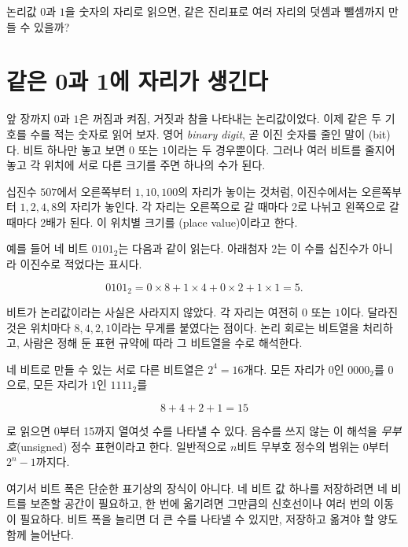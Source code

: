 \begin{objectivebox}
논리값 \(0\)과 \(1\)을 숫자의 자리로 읽으면, 같은 진리표로 여러 자리의 덧셈과 뺄셈까지 만들 수 있을까?
\end{objectivebox}

\section{같은 0과 1에 자리가 생긴다}

앞 장까지 \(0\)과 \(1\)은 꺼짐과 켜짐, 거짓과 참을 나타내는 논리값이었다. 이제 같은 두 기호를 수를 적는 숫자로 읽어 보자. 영어 \emph{binary digit}, 곧 이진 숫자를 줄인 말이 (bit)다. 비트 하나만 놓고 보면 \(0\) 또는 \(1\)이라는 두 경우뿐이다. 그러나 여러 비트를 줄지어 놓고 각 위치에 서로 다른 크기를 주면 하나의 수가 된다.

십진수 \(507\)에서 오른쪽부터 \(1,10,100\)의 자리가 놓이는 것처럼, 이진수에서는 오른쪽부터 \(1,2,4,8\)의 자리가 놓인다. 각 자리는 오른쪽으로 갈 때마다 2로 나뉘고 왼쪽으로 갈 때마다 2배가 된다. 이 위치별 크기를 (place value)이라고 한다.

예를 들어 네 비트 \(0101_2\)는 다음과 같이 읽는다. 아래첨자 \(2\)는 이 수를 십진수가 아니라 이진수로 적었다는 표시다.

\[
  0101_2
  =0\times8+1\times4+0\times2+1\times1
  =5.
\]

비트가 논리값이라는 사실은 사라지지 않았다. 각 자리는 여전히 \(0\) 또는 \(1\)이다. 달라진 것은 위치마다 \(8,4,2,1\)이라는 무게를 붙였다는 점이다. 논리 회로는 비트열을 처리하고, 사람은 정해 둔 표현 규약에 따라 그 비트열을 수로 해석한다\parencite{mit6004information}.

네 비트로 만들 수 있는 서로 다른 비트열은 \(2^4=16\)개다. 모든 자리가 \(0\)인 \(0000_2\)를 0으로, 모든 자리가 \(1\)인 \(1111_2\)를

\[
  8+4+2+1=15
\]

로 읽으면 0부터 15까지 열여섯 수를 나타낼 수 있다. 음수를 쓰지 않는 이 해석을 \emph{무부호}(unsigned) 정수 표현이라고 한다. 일반적으로 \(n\)비트 무부호 정수의 범위는 \(0\)부터 \(2^n-1\)까지다.

여기서 비트 폭은 단순한 표기상의 장식이 아니다. 네 비트 값 하나를 저장하려면 네 비트를 보존할 공간이 필요하고, 한 번에 옮기려면 그만큼의 신호선이나 여러 번의 이동이 필요하다. 비트 폭을 늘리면 더 큰 수를 나타낼 수 있지만, 저장하고 옮겨야 할 양도 함께 늘어난다.



